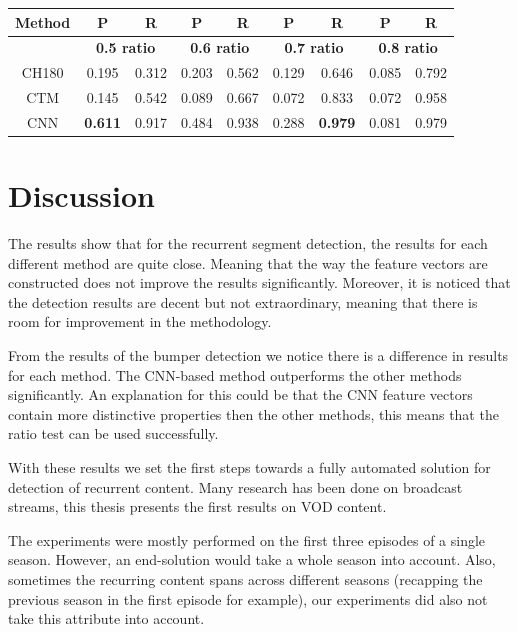 \documentclass{article}
\begin{document}
\begin{center}
	\begin{tabular}{ c c c c c c c c c} 
		\hline
		\textbf{Method} & \textbf{P} & \textbf{R} & \textbf{P} & \textbf{R} & \textbf{P} & \textbf{R} & \textbf{P} & \textbf{R} \\
		\hline
		& \multicolumn{2}{c}{\textbf{0.5 ratio}} & \multicolumn{2}{c}{\textbf{0.6 ratio}} & \multicolumn{2}{c}{\textbf{0.7 ratio}} & \multicolumn{2}{c}{\textbf{0.8 ratio}} \\
		\hline
		CH180 			& 0.195				& 0.312 		& 0.203		& 0.562		& 0.129		& 0.646 	& 0.085 	& 0.792 \\
		CTM 			&  0.145			& 0.542 		& 0.089		& 0.667 	& 0.072		& 0.833 	& 0.072 	& 0.958 \\
		CNN 			& \textbf{0.611}	& 0.917			& 0.484		& 0.938 	& 0.288		& \textbf{0.979} 	& 0.081 	& 0.979 \\
		\hline
	\end{tabular}
\end{center}

\section{Discussion} \label{discussion}
The results show that for the recurrent segment detection, the results for each different method are quite close. Meaning that the way the feature vectors are constructed does not improve the results significantly. Moreover, it is noticed that the detection results are decent but not extraordinary, meaning that there is room for improvement in the methodology. 

From the results of the bumper detection we notice there is a difference in results for each method. The CNN-based method outperforms the other methods significantly. An explanation for this could be that the CNN feature vectors contain more distinctive properties then the other methods, this means that the ratio test can be used successfully. 

With these results we set the first steps towards a fully automated solution for detection of recurrent content. Many research has been done on broadcast streams, this thesis presents the first results on VOD content.

The experiments were mostly performed on the first three episodes of a single season. However, an end-solution would take a whole season into account. Also, sometimes the recurring content spans across different seasons (recapping the previous season in the first episode for example), our experiments did also not take this attribute into account.
\end{document}
